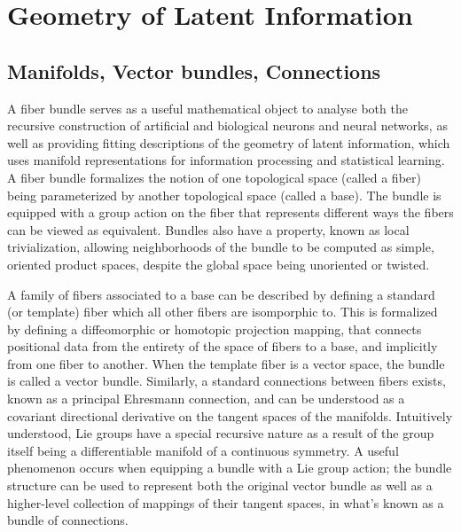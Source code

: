 \documentclass{article}
\begin{document}
\section{Geometry of Latent Information}
\subsection{Manifolds, Vector bundles, Connections}
    A fiber bundle serves as a useful mathematical object to analyse both the recursive construction of artificial and biological neurons and neural networks, as well as providing fitting descriptions of the geometry of latent information, which uses manifold representations for information processing and statistical learning.
    A fiber bundle formalizes the notion of one topological space (called a fiber) being parameterized by another topological space (called a base). The bundle is equipped with a group action on the fiber that represents different ways the fibers can be viewed as equivalent. Bundles also have a property, known as local trivialization, allowing neighborhoods of the bundle to be computed as simple, oriented product spaces, despite the global space  being unoriented or twisted.
    
    A family of fibers associated to a base can be described by defining a standard (or template) fiber which all other fibers are isomporphic to. This is formalized by defining a diffeomorphic or homotopic projection mapping, that connects positional data from the entirety of the space of fibers to a base, and implicitly from one fiber to another. When the template fiber is a vector space, the bundle is called a vector bundle. Similarly, a standard connections between fibers exists, known as a principal Ehresmann connection, and can be understood as a covariant directional derivative on the tangent spaces of the manifolds. Intuitively understood, Lie groups have a special recursive nature as a result of the group itself being a differentiable manifold of a continuous symmetry. A useful phenomenon occurs when equipping a bundle with a Lie group action; the bundle structure can be used to represent both the original vector bundle as well as a higher-level collection of mappings of their tangent spaces, in what's known as a bundle of connections. 
    
\end{document}
